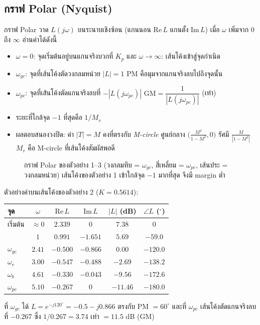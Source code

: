 \documentclass[12pt,a4paper]{article}
\newcommand{\jw}{j\omega}
\begin{document}
\subsection{กราฟ Polar (Nyquist)}
กราฟ Polar วาด $L(\jw)$ บนระนาบเชิงซ้อน (แกนนอน $\mathrm{Re}\,L$ แกนตั้ง $\mathrm{Im}\,L$) เมื่อ $\omega$ เพิ่มจาก $0$ ถึง $\infty$ อ่านค่าได้ดังนี้
\begin{itemize}[leftmargin=1.2em,itemsep=2pt]
\item $\omega=0$: จุดเริ่มต้นอยู่บนแกนจริงบวกที่ $K_p$ และ $\omega\to\infty$: เส้นโค้งเข้าสู่จุดกำเนิด
\item $\omega_{gc}$: จุดที่เส้นโค้งตัดวงกลมหน่วย $|L|=1$ \; PM คือมุมจากแกนจริงลบไปถึงจุดนั้น
\item $\omega_{pc}$: จุดที่เส้นโค้งตัดแกนจริงลบที่ $-|L(j\omega_{pc})|$ \; $\mathrm{GM}=\dfrac{1}{|L(j\omega_{pc})|}$ (เท่า)
\item ระยะที่ใกล้จุด $-1$ ที่สุดคือ $1/M_s$
\item ผลตอบสนองวงปิด: ค่า $|T|=M$ คงที่ตรงกับ \emph{M-circle} ศูนย์กลาง $\Big(\tfrac{M^2}{1-M^2},0\Big)$ รัศมี $\tfrac{M}{|1-M^2|}$ \; $M_r$ คือ M-circle ที่เส้นโค้งสัมผัสพอดี
\end{itemize}

\begin{figure}[h]
\centering

\caption{กราฟ Polar ของตัวอย่าง 1--3 (วงกลมทึบ = $\omega_{gc}$, สี่เหลี่ยม = $\omega_{pc}$, เส้นประ = วงกลมหน่วย) เส้นโค้งของตัวอย่าง 1 เข้าใกล้จุด $-1$ มากที่สุด จึงมี margin ต่ำ}
\end{figure}

ตัวอย่างค่าบนเส้นโค้งของตัวอย่าง 2 ($K=0.5614$):
\begin{center}
\small
\renewcommand{\arraystretch}{1.2}
\begin{tabular}{@{}lccccc@{}}
\toprule
จุด & $\omega$ & $\mathrm{Re}\,L$ & $\mathrm{Im}\,L$ & $|L|$ (dB) & $\angle L$ ($^\circ$) \\
\midrule
เริ่มต้น & $\approx0$ & $2.339$ & $0$ & $7.38$ & $0$ \\
 & $1$ & $0.991$ & $-1.651$ & $5.69$ & $-59.0$ \\
$\omega_{gc}$ & $2.41$ & $-0.500$ & $-0.866$ & $0.00$ & $-120.0$ \\
$\omega_r$ & $3.00$ & $-0.547$ & $-0.488$ & $-2.69$ & $-138.2$ \\
$\omega_b$ & $4.61$ & $-0.330$ & $-0.043$ & $-9.56$ & $-172.6$ \\
$\omega_{pc}$ & $5.10$ & $-0.267$ & $0$ & $-11.46$ & $-180.0$ \\
\bottomrule
\end{tabular}
\end{center}
ที่ $\omega_{gc}$ ได้ $L=e^{-j120^\circ}=-0.5-j0.866$ ตรงกับ PM $=60^\circ$ และที่ $\omega_{pc}$ เส้นโค้งตัดแกนจริงลบที่ $-0.267$ ซึ่ง $1/0.267=3.74$ เท่า $=11.5$ dB (GM)
\end{document}
